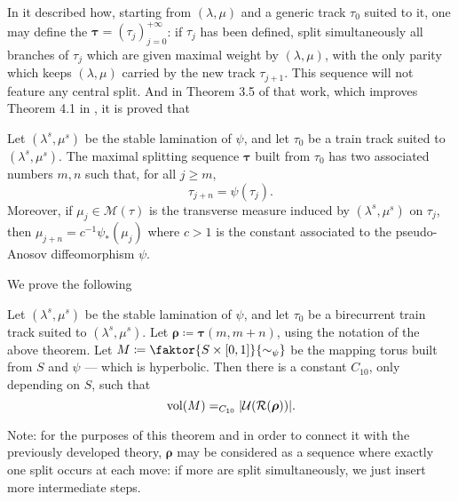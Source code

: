 In \cite{agol_pa} it described how, starting from $(\lambda,\mu)$ and a generic track $\tau_0$ suited to it, one may define the  $\bm\tau=(\tau_j)_{j=0}^{+\infty}$: if $\tau_j$ has been defined, split simultaneously all branches of $\tau_j$ which are given maximal weight by $(\lambda,\mu)$, with the only parity which keeps $(\lambda,\mu)$ carried by the new track $\tau_{j+1}$. This sequence will not feature any central split. And in Theorem 3.5 of that work, which improves Theorem 4.1 in \cite{papadopoulos}, it is proved that
\begin{theo}
Let $(\lambda^s,\mu^s)$ be the stable lamination of $\psi$, and let $\tau_0$ be a train track suited to $(\lambda^s,\mu^s)$. The maximal splitting sequence $\bm\tau$ built from $\tau_0$ has two associated numbers $m,n$ such that, for all $j\geq m$,
$$
\tau_{j+n}=\psi(\tau_j).
$$
Moreover, if $\mu_j\in\mathcal M(\tau)$ is the transverse measure induced by $(\lambda^s,\mu^s)$ on $\tau_j$, then $\mu_{j+n}=c^{-1}\psi_*(\mu_j)$ where $c>1$ is the constant associated to the pseudo-Anosov diffeomorphism $\psi$.
\end{theo}

We prove the following
\begin{theo}\label{thm:agol_volume}
Let $(\lambda^s,\mu^s)$ be the stable lamination of $\psi$, and let $\tau_0$ be a birecurrent train track suited to $(\lambda^s,\mu^s)$. Let $\bm\rho\coloneqq \bm\tau(m,m+n)$, using the notation of the above theorem. Let $M\coloneqq \faktor{S\times [0,1]}{\sim_\psi}$ be the mapping torus built from $S$ and $\psi$ --- which is hyperbolic. Then there is a constant $C_{10}$, only depending on $S$, such that
$$
\mathrm{vol}(M)=_{C_{10}} |{\mathcal U}({\mathcal R}(\bm\rho))|.
$$
\end{theo}

Note: for the purposes of this theorem and in order to connect it with the previously developed theory, $\bm\rho$ may be considered as a sequence where exactly one split occurs at each move: if more are split simultaneously, we just insert more intermediate steps.

